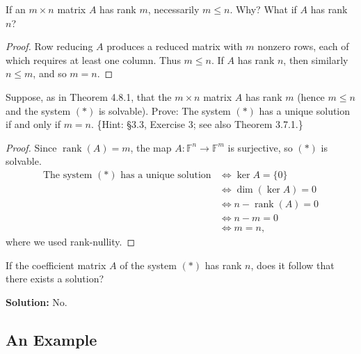 \begin{tcolorbox}[title=Exercise 1, breakable]
    If an $m \times n$ matrix $A$ has rank $m$, necessarily $m \leq n$. Why? What if $A$ has rank $n$?
\end{tcolorbox}

\begin{proof}
    Row reducing $A$ produces a reduced matrix with $m$ nonzero rows,
    each of which requires at least one column. Thus $m \leq n$.
    If $A$ has rank $n$, then similarly $n \leq m$, and so $m = n$.
\end{proof}

\begin{tcolorbox}[title=Exercise 2, breakable]
    Suppose, as in Theorem 4.8.1, that the $m \times n$ matrix $A$ has rank $m$
    (hence $m \leq n$ and the system $(*)$ is solvable).
    Prove: The system $(*)$ has a unique solution if and only if $m = n$.
    \{Hint: \S3.3, Exercise 3; see also Theorem 3.7.1.\}
\end{tcolorbox}

\begin{proof}
    Since $\operatorname{rank}(A)=m$, the map
    $A:\mathbb{F}^n \to \mathbb{F}^m$ is surjective, so $(*)$ is solvable.
    \begin{align*}
        \text{The system $(*)$ has a unique solution} &\iff \ker A = \{0\} \\
        &\iff \dim(\ker A)=0 \\
        &\iff n-\operatorname{rank}(A)=0 \\
        &\iff n-m=0 \\
        &\iff m=n, 
    \end{align*}
    where we used rank-nullity.
\end{proof}

\begin{tcolorbox}[title=Exercise 3, breakable]
    If the coefficient matrix $A$ of the system $(*)$ has rank $n$, does it follow that there exists a solution?
\end{tcolorbox}

\textbf{Solution: } No.

\subsection{An Example}

